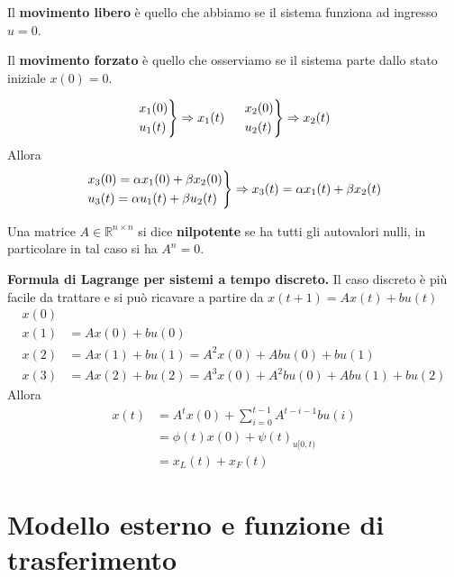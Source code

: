 \documentclass[10pt,a4paper]{book}
\begin{document}
Il \textbf{movimento libero} è quello che abbiamo se il sistema funziona ad ingresso $u=0$.

Il \textbf{movimento forzato} è quello che osserviamo se il sistema parte dallo stato iniziale $x(0) =0$.
\begin{theorem}
\begin{equation*}
\begin{drcases}
x_1(0)\\
u_1(t)
\end{drcases} \Rightarrow x_1(t) \ \ \ \ \begin{drcases}
x_2(0)\\
u_2(t)
\end{drcases} \Rightarrow x_2(t)
\end{equation*}
Allora
\begin{equation*}
\begin{drcases}
x_3(0) =\alpha x_1(0) +\beta x_2(0)\\
u_3(t) =\alpha u_1(t) +\beta u_2(t)
\end{drcases} \Rightarrow x_3(t) =\alpha x_1(t) +\beta x_2(t)
\end{equation*}
\end{theorem}
\begin{ricalg}
Una matrice $A\in \mathbb{R}^{n\times n}$ si dice \textbf{nilpotente} se ha tutti gli autovalori nulli, in particolare in tal caso si ha $A^n =0$.
\end{ricalg}
\textbf{Formula di Lagrange per sistemi a tempo discreto.} Il caso discreto è più facile da trattare e si può ricavare a partire da $x(t+1)=Ax(t)+bu(t)$
\begin{equation*}
\begin{aligned}
x(0) & \\
x(1) & =Ax(0) +bu(0)\\
x(2) & =Ax(1) +bu(1) =A^2 x(0) +Abu(0) +bu(1)\\
x(3) & =Ax(2) +bu(2) =A^3 x(0) +A^2 bu(0) +Abu(1) +bu(2)
\end{aligned}
\end{equation*}
Allora
\begin{equation}
\boxed{
\begin{aligned}
x(t) & =A^t x(0) +\sum\limits ^{t-1}_{i=0} A^{t-i-1} bu(i)\\
 & =\phi (t) x(0) +\psi (t)_{u[ 0,t)}\\
 & =x_L(t) +x_F(t)
\end{aligned}
}
\end{equation}
\section{Modello esterno e funzione di trasferimento}
\end{document}

